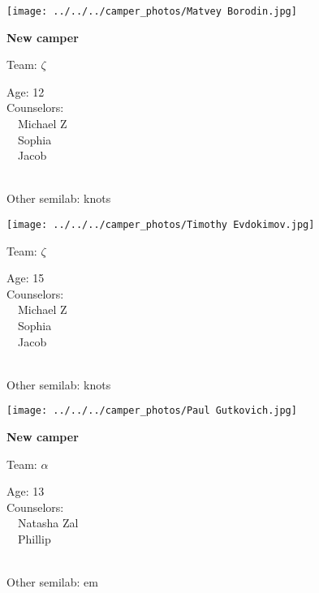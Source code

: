 \documentclass[10pt,letterpaper, landscape]{article}
\begin{document}
\verticalshiftfornextsticker
\renewcommand{\baselinestretch}{1} \begin{sticker}
\noindent\begin{minipage}{0.5\textwidth}\texttt{[image: ../../../camper\_photos/Matvey Borodin.jpg]}\end{minipage}\begin{minipage}{0.45\textwidth}
\textbf{New camper} 

Team: {\Large $\zeta$}

Age:        12\\
Counselors: \\\ \ Michael Z\\\ \ Sophia\\\ \ Jacob\\
\end{minipage} \\ \vspace{0.07in}
Other semilab: knots
\end{sticker}
\horizontalshiftfornextsticker
\renewcommand{\baselinestretch}{1} \begin{sticker}
\noindent\begin{minipage}{0.5\textwidth}\texttt{[image: ../../../camper\_photos/Timothy Evdokimov.jpg]}\end{minipage}\begin{minipage}{0.45\textwidth}
Team: {\Large $\zeta$}

Age:        15\\
Counselors: \\\ \ Michael Z\\\ \ Sophia\\\ \ Jacob\\
\end{minipage} \\ \vspace{0.07in}
Other semilab: knots
\end{sticker}
\horizontalshiftfornextsticker
\renewcommand{\baselinestretch}{1} \begin{sticker}
\noindent\begin{minipage}{0.5\textwidth}\texttt{[image: ../../../camper\_photos/Paul Gutkovich.jpg]}\end{minipage}\begin{minipage}{0.45\textwidth}
\textbf{New camper} 

Team: {\Large $\alpha$}

Age:        13\\
Counselors: \\\ \ Natasha Zal\\\ \ Phillip\\
\end{minipage} \\ \vspace{0.07in}
Other semilab: em
\end{sticker}
\end{document}
